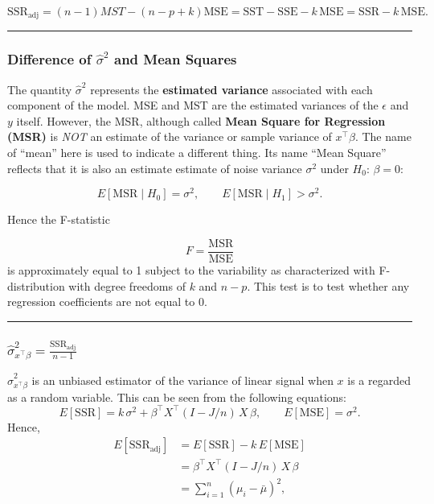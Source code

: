 \documentclass[
  letterpaper,
  DIV=11,
  numbers=noendperiod]{scrreprt}
\begin{document}
\[
\mathrm{SSR}_{\mathrm{adj}} = (n-1)MST-(n-p+k)\mathrm{MSE} = \mathrm{SST}-\mathrm{SSE} - k\,\mathrm{MSE} = \mathrm{SSR} - k\,\mathrm{MSE}.
\]

\begin{center}\rule{0.5\linewidth}{0.5pt}\end{center}

\subsubsection{\texorpdfstring{Difference of \(\hat{\sigma}^2\) and Mean
Squares}{Difference of \textbackslash hat\{\textbackslash sigma\}\^{}2 and Mean Squares}}\label{difference-of-hatsigma2-and-mean-squares}

The quantity \(\hat{\sigma}^2\) represents the \textbf{estimated
variance} associated with each component of the model. MSE and MST are
the estimated variances of the \(\epsilon\) and \(y\) itself. However,
the MSR, although called \textbf{Mean Square for Regression (MSR)} is
\emph{NOT} an estimate of the variance or sample variance of
\(x^\top \beta\). The name of ``mean'' here is used to indicate a
different thing. Its name ``Mean Square'' reflects that it is also an
estimate estimate of noise variance \(\sigma^2\) under
\(H_0\!:\,\beta = 0\):

\[
E[\mathrm{MSR} \mid H_0] = \sigma^2,
\qquad 
E[\mathrm{MSR} \mid H_1] > \sigma^2.
\]

Hence the F-statistic

\[
F = \frac{\mathrm{MSR}}{\mathrm{MSE}}
\] is approximately equal to 1 subject to the variability as
characterized with F-distribution with degree freedoms of \(k\) and
\(n-p\). This test is to test whether any regression coefficients are
not equal to 0.

\begin{center}\rule{0.5\linewidth}{0.5pt}\end{center}

\subsubsection{\texorpdfstring{\(\hat \sigma^2_{x^\top\beta}=\frac{\mathrm{SSR}_{\text{adj}}}{n-1}\)}{\textbackslash hat \textbackslash sigma\^{}2\_\{x\^{}\textbackslash top\textbackslash beta\}=\textbackslash frac\{\textbackslash mathrm\{SSR\}\_\{\textbackslash text\{adj\}\}\}\{n-1\}}}\label{hat-sigma2_xtopbetafracmathrmssr_textadjn-1}

\(\hat \sigma^2_{x^\top\beta}\) is an unbiased estimator of the variance
of linear signal when \(x\) is a regarded as a random variable. This can
be seen from the following equations: \[
E[\mathrm{SSR}] = k\,\sigma^2 + \beta^\top X^\top (I - J/n)\,X\,\beta,
\qquad
E[\mathrm{MSE}] = \sigma^2.
\] Hence, \[
\begin{aligned}
E[\mathrm{SSR}_{\mathrm{adj}}]
&= E[\mathrm{SSR}] - k\,E[\mathrm{MSE}] \\
&= \beta^\top X^\top (I - J/n)\,X\,\beta \\
&= \sum_{i=1}^n (\mu_i - \bar\mu)^2,
\end{aligned}
\]
\end{document}
